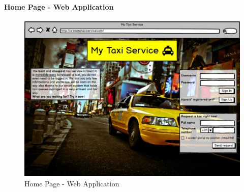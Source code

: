 \paragraph{Home Page - Web Application}
\begin{figure}[!h]
	\begin{center}					
		\includegraphics[scale=0.45]{../SE2_MOCKUPS/WebAppHomePage.png}
		\caption{Home Page - Web Application}
	\end{center}	
\end{figure}
\newpage
